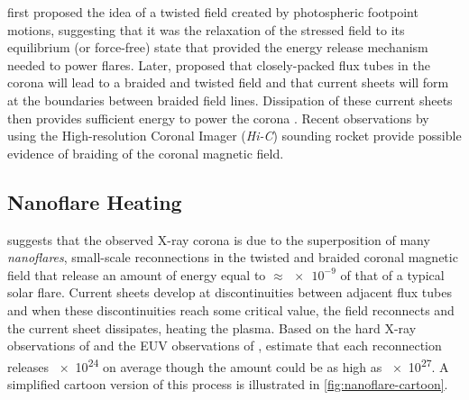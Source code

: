 \citet{gold_magnetic_1964} first proposed the idea of a twisted field created by photospheric footpoint motions, suggesting that it was the relaxation of the stressed field to its equilibrium (or force-free) state that provided the energy release mechanism needed to power flares. Later, \citet{parker_topological_1972} proposed that closely-packed flux tubes in the corona will lead to a braided and twisted field and that current sheets will form at the boundaries between braided field lines. Dissipation of these current sheets then provides sufficient energy to power the corona \citep{parker_magnetic_1983,parker_magnetic_1983-1}. Recent observations by \citet{cirtain_energy_2013} using the High-resolution Coronal Imager (\textit{Hi-C}) sounding rocket provide possible evidence of braiding of the coronal magnetic field.

\subsection{Nanoflare Heating}\label{sec:nanoflares}

\citet{parker_nanoflares_1988} suggests that the observed X-ray corona is due to the superposition of many \textit{nanoflares}, small-scale reconnections in the twisted and braided coronal magnetic field that release an amount of energy equal to $\approx\num{e-9}$ of that of a typical solar flare. Current sheets develop at discontinuities between adjacent flux tubes and when these discontinuities reach some critical value, the field reconnects and the current sheet dissipates, heating the plasma. Based on the hard X-ray observations of \citet{lin_solar_1984} and the EUV observations of \citet{brueckner_observations_1983}, \citeauthor{parker_nanoflares_1988} estimate that each reconnection releases \SI{e24}{\erg} on average though the amount could be as high as \SI{e27}{\erg}. A simplified cartoon version of this process is illustrated in \autoref{fig:nanoflare-cartoon}.

